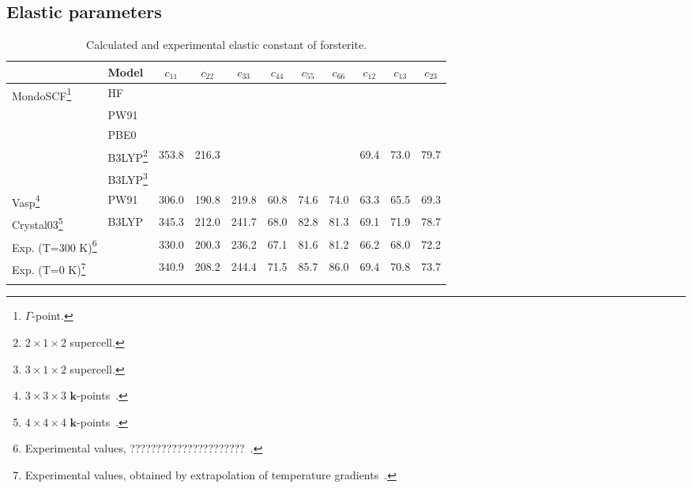\documentclass[pra,twocolumn,twocolumngrid,superbib]{revtex4} %
\begin{document}
\subsection{Elastic parameters}

\begin{table}[t]
  \centering
  \caption{\protect
    Calculated and experimental elastic constant of forsterite.
  }\label{Tab:ElasticConstants}
  \begin{tabular}{llccccccccc}
  \toprule
  & Model & $c_{11}$ & $c_{22}$ & $c_{33}$ & $c_{44}$ & $c_{55}$ 
  & $c_{66}$ & $c_{12}$ & $c_{13}$ & $c_{23}$  \\
  \hline
    {\sc MondoSCF}\footnote[1]{$\Gamma$-point.}
  & HF    & & & & & & & & & \\
  & PW91  & & & & & & & & & \\
  & PBE0  & & & & & & & & & \\
  & B3LYP\footnote[2]{$2\times 1\times 2$ supercell.} %
          & 353.8 & 216.3 & & & & & 69.4 & 73.0 & 79.7 \\
  & B3LYP\footnote[3]{$3\times 1\times 2$ supercell.} %
          & & & & & & & & & \\
  \hline
    {\sc Vasp}\footnote[4]{$3\times 3\times 3$ $\mathbf{k}$-points~\cite{PJochym04}.}
  & PW91  & 306.0 & 190.8 & 219.8 & 60.8 & 74.6 & 74.0 & 63.3 & 65.5 & 69.3 \\
    {\sc Crystal03}\footnote[5]{$4\times 4\times 4$ $\mathbf{k}$-points~\cite{YNoel06}.}
  & B3LYP & 345.3 & 212.0 & 241.7 & 68.0 & 82.8 & 81.3 & 69.1 & 71.9 & 78.7 \\
  \hline
    {Exp. (T=300 K)}\footnote[6]{Experimental values, ??????????????????????~\cite{DIssak89}.}
  &       & 330.0 & 200.3 & 236.2 & 67.1 & 81.6 & 81.2 & 66.2 & 68.0 & 72.2 \\
    {Exp. (T=0 K)}\footnote[7]{Experimental values, 
      obtained by extrapolation of temperature gradients~\cite{YNoel06,DIssak89}.}
  &       & 340.9 & 208.2 & 244.4 & 71.5 & 85.7 & 86.0 & 69.4 & 70.8 & 73.7 \\
  \botrule
  \end{tabular}
\end{table}
\end{document}

